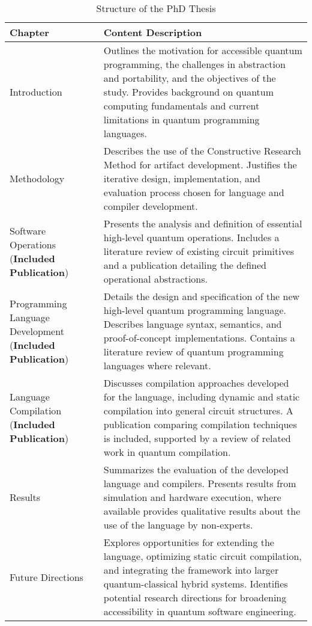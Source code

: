 \documentclass[journal,onecolumn, compsoc]{IEEEtran}
\begin{document}
\begin{table}[H]
\centering
\caption{Structure of the PhD Thesis}
\begin{tabular}{@{}p{4cm} p{10cm}@{}}
\toprule
\textbf{Chapter} & \textbf{Content Description} \\
\midrule

Introduction & Outlines the motivation for accessible quantum programming, the challenges in abstraction and portability, and the objectives of the study. Provides background on quantum computing fundamentals and current limitations in quantum programming languages. \\
\midrule

Methodology & Describes the use of the Constructive Research Method for artifact development. Justifies the iterative design, implementation, and evaluation process chosen for language and compiler development. \\
\midrule

Software Operations (\textbf{Included Publication}) & Presents the analysis and definition of essential high-level quantum operations. Includes a literature review of existing circuit primitives and a publication detailing the defined operational abstractions. \\
\midrule

Programming Language Development (\textbf{Included Publication}) & Details the design and specification of the new high-level quantum programming language. Describes language syntax, semantics, and proof-of-concept implementations. Contains a literature review of quantum programming languages where relevant. \\
\midrule

Language Compilation (\textbf{Included Publication}) & Discusses compilation approaches developed for the language, including dynamic and static compilation into general circuit structures. A publication comparing compilation techniques is included, supported by a review of related work in quantum compilation. \\
\midrule

Results & Summarizes the evaluation of the developed language and compilers. Presents results from simulation and hardware execution, where available provides qualitative results about the use of the language by non-experts. \\
\midrule

Future Directions & Explores opportunities for extending the language, optimizing static circuit compilation, and integrating the framework into larger quantum-classical hybrid systems. Identifies potential research directions for broadening accessibility in quantum software engineering. \\
\bottomrule
\end{tabular}
\end{table}
\end{document}
